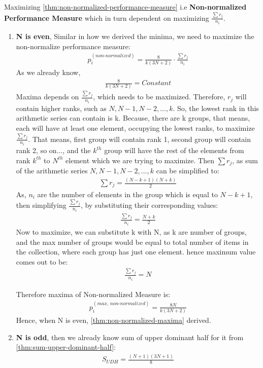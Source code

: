 \documentclass[a4paper,fleqn,review]{cas-sc}
\begin{document}
\begin{pot}[\ref{thm:non-normalized-maxima}]
	Maximizing \autoref{thm:non-normalized-performance-measure} i.e \textbf{Non-normalized Performance Measure} which in turn dependent on maximizing $\frac{\sum r_j}{n_i}$.
\end{pot}
\begin{enumerate} 
	\item \textbf{N is even}, Similar in how we derived the minima, we need to maximize the non-normalize performance measure:
	\begin{align*}
		p_i^{(non\text{-}normalized)} = \frac{8}{k(3N + 2)}\cdot \frac{\sum r_j}{n_i}
	\end{align*}
	As we already know, 
	\begin{align*}
		\frac{8}{k(3N + 2)} = Constant
	\end{align*}
	Maxima depends on $\frac{\sum r_j}{n_i}$, which needs to be maximized. Therefore, $r_j$ will contain higher ranks, such as $N, N-1, N-2,... ,k$. So, the lowest rank in this arithmetic series can contain is k. Because, there are k groups, that means, each will have at least one element, occupying the lowest ranks, to maximize $\frac{\sum r_j}{n_i}$. That means, first group will contain rank 1, second group will contain rank 2, so on..., and the $k^{th}$ group will have the rest of the elements from rank $k^{th}$ to $N^{th}$ element which we are trying to maximize. Then $\sum r_j$, as sum of the arithmetic series  $N, N-1, N-2,... ,k$ can be simplified to:
	\begin{align*}
		\sum r_j = \frac{(N-k+1)(N+k)}{2}
	\end{align*}
	As, $n_i$ are the number of elements in the group which is equal to $N-k+1$, then simplifying $\frac{\sum r_j}{n_i}$, by substituting their corresponding values:
	\begin{align*}
		\frac{\sum r_j}{n_i} = \frac{N+k}{2}
	\end{align*}
	Now to maximize, we can substitute k with N, as k are number of groups, and the max number of groups would be equal to total number of items in the collection, where each group has just one element.
	hence maximum value comes out to be:
	\begin{align*}
		\frac{\sum r_j}{n_i} = N
	\end{align*}
	
	Therefore maxima of Non-normalized Measure is:
	\begin{align*}
		p_i^{(max, \, non\text{-}normalized)} = \frac{8N}{k(3N + 2)}
	\end{align*}
	Hence, when N is even, \autoref{thm:non-normalized-maxima} derived.
	\item \textbf{N is odd}, then we already know sum of upper dominant half for it from \autoref{thm:sum-upper-dominant-half}:
	\begin{align*}
		S_{UDH} = \frac{(N+1)(3N+1)}{8}
	\end{align*}
	

\end{enumerate}
\end{document}

